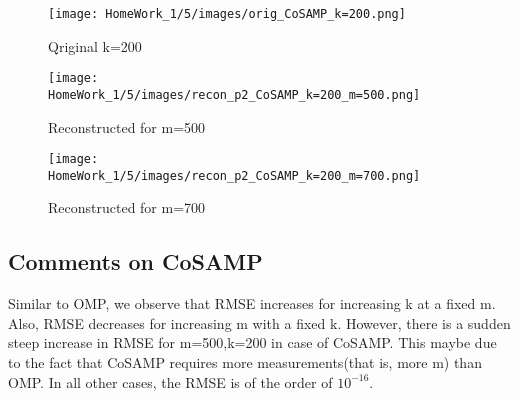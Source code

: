 \documentclass{article}
\begin{document}
\begin{figure}[h!]
    \centering
    \begin{minipage}{0.1\textwidth}
        \texttt{[image: HomeWork\_1/5/images/orig\_CoSAMP\_k=200.png]}
        \caption{Qriginal k=200}
    \end{minipage}
    \hspace{0.5cm}
    \begin{minipage}{0.1\textwidth}
        \centering
        \texttt{[image: HomeWork\_1/5/images/recon\_p2\_CoSAMP\_k=200\_m=500.png]}
        \caption{Reconstructed for m=500}
    \end{minipage}
    \hspace{0.5cm}
    \begin{minipage}{0.1\textwidth}
        \centering
        \texttt{[image: HomeWork\_1/5/images/recon\_p2\_CoSAMP\_k=200\_m=700.png]}
        \caption{Reconstructed for m=700}
    \end{minipage}
\end{figure}
\FloatBarrier
\subsection*{Comments on CoSAMP}
Similar to OMP, we observe that RMSE increases for increasing k at a fixed m. Also, RMSE decreases for increasing m with a fixed k.
However, there is a sudden steep increase in RMSE for m=500,k=200 in case of CoSAMP. This maybe due to the fact that CoSAMP requires more measurements(that is, more m) than OMP. In all other cases, the RMSE is of the order of $10^{-16}$.
\end{document}
